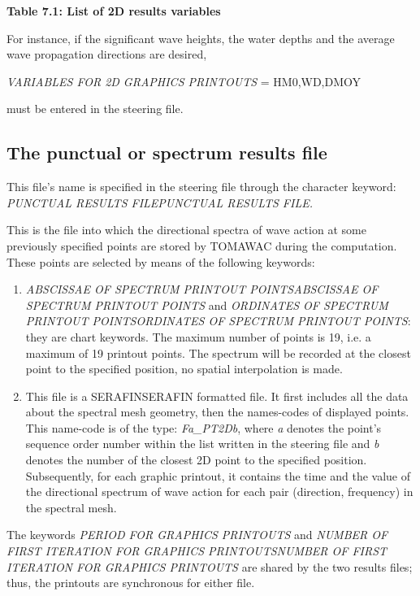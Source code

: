 \textbf{Table 7.1: List of 2D results variables}

 For instance, if the significant wave heights, the water depths and the average wave propagation directions are desired,

 \textit{VARIABLES FOR 2D GRAPHICS PRINTOUTS }= HM0,WD,DMOY

 must be entered in the steering file.


\subsection{ The punctual or spectrum results file}

 This file's name is specified in the steering file through the character keyword: \textit{PUNCTUAL RESULTS FILEPUNCTUAL RESULTS FILE.}

 This is the file into which the directional spectra of wave action at some previously specified points are stored by TOMAWAC during the computation. These points are selected by means of the following keywords:

\begin{enumerate}
\item  \textit{ABSCISSAE OF SPECTRUM PRINTOUT POINTSABSCISSAE OF SPECTRUM PRINTOUT POINTS} and \textit{ORDINATES OF SPECTRUM PRINTOUT POINTSORDINATES OF SPECTRUM PRINTOUT POINTS}: they are chart keywords. The maximum number of points is 19, i.e. a maximum of 19 printout points. The spectrum will be recorded at the closest point to the specified position, no spatial interpolation is made.

\item  This file is a SERAFINSERAFIN formatted file. It first includes all the data about the spectral mesh geometry, then the names-codes of displayed points. This name-code is of the type: \textit{Fa\_PT2Db}, where \textit{a }denotes the point's sequence order number within the list written in the steering file and \textit{b} denotes the number of the closest 2D point to the specified position. Subsequently, for each graphic printout, it contains the time and the value of the directional spectrum of wave action for each pair (direction, frequency) in the spectral mesh.
\end{enumerate}

 The keywords \textit{PERIOD FOR GRAPHICS PRINTOUTS }and \textit{NUMBER OF FIRST ITERATION FOR GRAPHICS PRINTOUTSNUMBER OF FIRST ITERATION FOR GRAPHICS PRINTOUTS} are shared by the two results files; thus, the printouts are synchronous for either file.


